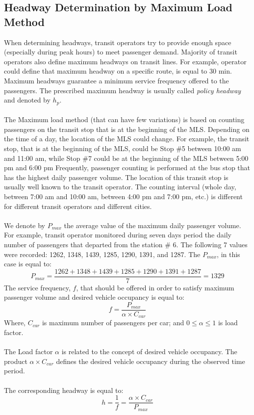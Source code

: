 \subsection{Headway Determination by Maximum Load Method}
When determining headways, transit operators try to provide enough space (especially during peak hours) to meet passenger demand. Majority of transit operators also define maximum headways on transit lines. For example, operator could define that maximum headway on a specific route, is equal to 30 min. Maximum headways guarantee a minimum service frequency offered to the passengers. The prescribed maximum headway is usually called \textit{policy headway} and denoted by $ h_p $.\\\\
The Maximum load method (that can have few variations) is based on counting passengers on the transit stop that is at the beginning of the MLS. Depending on the time of a day, the location of the MLS could change. For example, the transit stop, that is at the beginning of the MLS, could be Stop \#5 between 10:00 am and 11:00 am, while Stop \#7 could be at the beginning of the MLS between 5:00 pm and 6:00 pm Frequently, passenger counting is performed at the bus stop that has the highest daily passenger volume. The location of this transit stop is usually well known to the transit operator. The counting interval (whole day, between 7:00 am and 10:00 am, between 4:00 pm and 7:00 pm, etc.) is different for different transit operators and different cities.\\\\
We denote by $ P_{max} $ the average value of the maximum daily passenger volume. For example, transit operator monitored during seven days period the daily number of passengers that departed from the station \# 6. The following 7 values were recorded: 1262, 1348, 1439, 1285, 1290, 1391, and 1287. The $ P_{max} $, in this case is equal to:
$$ P_{max} = \frac{1262 + 1348 + 1439 + 1285 + 1290 + 1391 + 1287}{7} = 1329 $$
%
The service frequency, $ f $, that should be offered in order to satisfy maximum passenger volume and desired vehicle occupancy is equal to:
\begin{equation}
	f = \frac{P_{max}}{\alpha \times C_{car}}
\end{equation}
Where, $ C_{car} $ is maximum number of passengers per car; and $ 0 \leq \alpha \leq 1$ is load factor.\\\\
The Load factor $ \alpha $ is related to the concept of desired vehicle occupancy. The product $ \alpha \times C_{car} $ defines the desired vehicle occupancy during the observed time period.\\\\
The corresponding headway is equal to:
\begin{equation}
	h = \frac{1}{f} = \frac{\alpha \times C_{car}}{P_{max}}
\end{equation}
%
